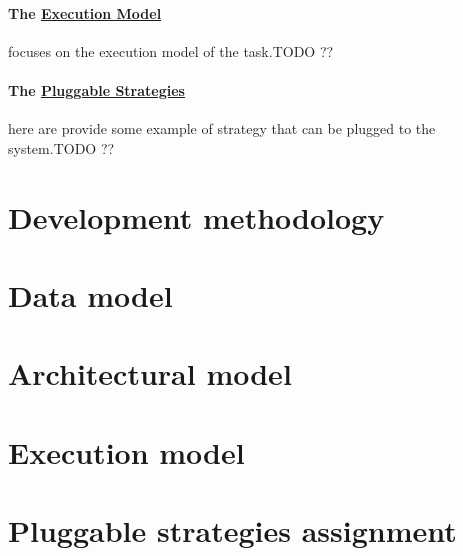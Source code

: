 \paragraph{The \hyperref[sec:model:execution]{Execution Model}} focuses on the
execution model of the task.TODO ??

\paragraph{The \hyperref[sec:model:strategies]{Pluggable Strategies}} here are
provide some example of strategy that can be plugged to the system.TODO ??

\section{Development methodology}
\label{sec:model:method}


\section{Data model}
\label{sec:model:data}


\section{Architectural model}
\label{sec:model:architecture}


\section{Execution model}
\label{sec:model:execution}


\section{Pluggable strategies assignment}
\label{sec:model:strategies}

